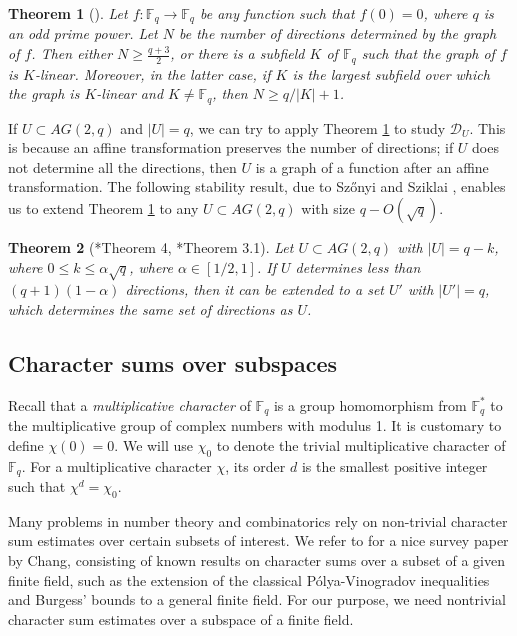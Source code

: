 \documentclass[12pt,reqno]{amsart}
\newtheorem{thm}{Theorem}[section]
\theoremstyle{definition}
\newcommand{\F}{\mathbb{F}}
\begin{document}
\begin{thm}[\cite{Ball03}]\label{Ball03}
Let $f:\F_q \to \F_q$ be any function such that $f(0)=0$, where $q$ is an odd prime power. Let $N$ be the number of directions determined by the graph of $f$. Then either $N \geq \frac{q+3}{2}$, or there is a subfield $K$ of $\F_q$ such that the graph of $f$ is $K$-linear. Moreover, in the latter case, if $K$ is the
largest subfield over which the graph is $K$-linear and $K \neq \F_q$, then $N \geq q/|K|+1$.
\end{thm}

If $U \subset AG(2,q)$ and $|U|=q$, we can try to apply Theorem \ref{Ball03} to study $\mathcal{D}_U$. This is because an affine transformation preserves the number of directions; if $U$ does not determine all the directions, then $U$ is a graph of a function after an affine transformation. The following stability result, due to Sz\H{o}nyi \cite{Sz1} and Sziklai \cite{Szi99}, enables us to extend Theorem \ref{Ball03} to any $U \subset AG(2,q)$ with size $q-O(\sqrt{q})$. 

\begin{thm}[\cite{Sz1}*{Theorem 4}, \cite{Szi99}*{Theorem 3.1}] \label{extension}
Let $U \subset AG(2,q)$ with $|U|=q-k$, where $0 \leq k \leq \alpha \sqrt{q}$, where $\alpha \in [1/2,1]$. If $U$ determines less than $(q+1)(1-\alpha)$ directions, then it can be extended to a set $U'$ with $|U'|=q$, which determines the same set of directions as $U$.
\end{thm}

\subsection{Character sums over subspaces} \label{charsumsection}
 Recall that a {\em multiplicative character} of $\F_q$ is a group homomorphism from $\F_q^*$ to the multiplicative group of complex numbers with modulus 1. It is customary to define $\chi(0)=0$. We will use $\chi_0$ to denote the trivial multiplicative character of $\F_q$. For a multiplicative character $\chi$, its order $d$ is the smallest positive integer such that $\chi^d=\chi_0$. 

Many problems in number theory and combinatorics rely on non-trivial character sum estimates over certain subsets of interest. We refer to \cite{Chang} for a nice survey paper by Chang, consisting of known results on character sums over a subset of a given finite field, such as the extension of the classical P\'olya-Vinogradov inequalities and Burgess' bounds to a general finite field. For our purpose, we need nontrivial character sum estimates over a subspace of a finite field.
\end{document}
